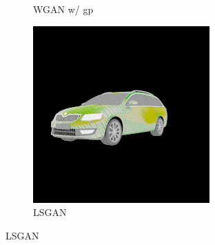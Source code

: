 \begin{figure}
\begin{subfigure}[t]{0.3\linewidth}
        \caption{WGAN w/ gp}
    \end{subfigure}
    \begin{subfigure}[t]{0.3\linewidth}
        \centering
      \includegraphics[width=\linewidth]{graphics/gan_lsgan.png}
        \caption{LSGAN}
    \end{subfigure}
\end{figure}